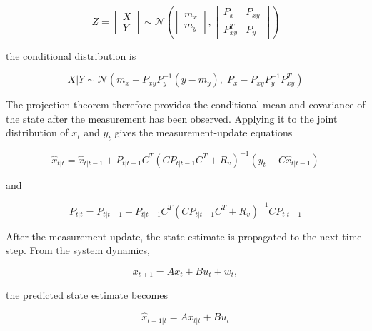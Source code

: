 \begin{equation}
    Z=
    \begin{bmatrix}
        X \\
        Y
    \end{bmatrix}
    \sim
    \mathcal{N}
    \left(
    \begin{bmatrix}
        m_x \\
        m_y
    \end{bmatrix},
    \begin{bmatrix}
        P_x & P_{xy} \\
        P_{xy}^T & P_y
    \end{bmatrix}
    \right)
\end{equation}

the conditional distribution is

\begin{equation}
    X|Y
    \sim
    \mathcal{N}
    \left(
        m_x
        +
        P_{xy}P_y^{-1}(y-m_y),
        \;
        P_x
        -
        P_{xy}P_y^{-1}P_{xy}^T
    \right)
\end{equation}

The projection theorem therefore provides the conditional mean and covariance
of the state after the measurement has been observed. Applying it to the
joint distribution of \(x_t\) and \(y_t\) gives the measurement-update
equations

\begin{equation}
    \boxed{
    \hat{x}_{t|t}
    =
    \hat{x}_{t|t-1}
    +
    P_{t|t-1}C^T
    \left(
        CP_{t|t-1}C^T+R_v
    \right)^{-1}
    \left(
        y_t-C\hat{x}_{t|t-1}
    \right)
    }
\end{equation}

and

\begin{equation}
    \boxed{
    P_{t|t}
    =
    P_{t|t-1}
    -
    P_{t|t-1}C^T
    \left(
        CP_{t|t-1}C^T+R_v
    \right)^{-1}
    CP_{t|t-1}
    }
\end{equation}

After the measurement update, the state estimate is propagated to the next
time step. From the system dynamics,

\begin{equation}
    x_{t+1}
    =
    Ax_t+Bu_t+w_t,
\end{equation}

the predicted state estimate becomes

\begin{equation}
    \boxed{
    \hat{x}_{t+1|t}
    =
    A\hat{x}_{t|t}+Bu_t
    }
\end{equation}

